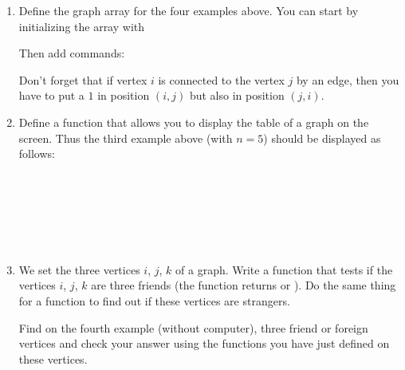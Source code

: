 \documentclass[11pt,class=report,crop=false]{standalone}
\begin{document}
\begin{activite}
\begin{enumerate}
  \item Define the graph array for the four examples above.
  You can start by initializing the array with   
  
  Then add commands: 
  
  Don't forget that if vertex $i$ is connected to the vertex $j$ by an edge, then you have to put a $1$ in position $(i,j)$ but also in position $(j,i)$. 
  
  \item Define a  function that allows you to display the table of a graph on the screen.
  Thus the third example above (with $n=5$) should be displayed as follows:
\begin{center}
\\
\\
\\
\\
\\
\end{center}

  \item We set the three vertices $i$, $j$, $k$ of a graph. Write a  function that tests if the vertices $i$, $j$, $k$ are three friends (the function returns  or ). Do the same thing for a  function to find out if these vertices are strangers.
  
Find on the fourth example (without computer), three friend or foreign vertices and check your answer using the functions you have just defined on these vertices.

\end{enumerate}   
     
\end{activite}


\end{document}
